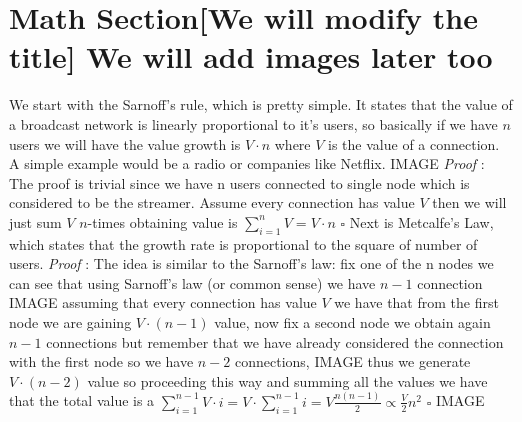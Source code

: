 \documentclass[12pt, a4page]{article}
\begin{document}
\section{Math Section[We will modify the title] We will add images later too}
We start with the Sarnoff's rule, which is pretty simple. It states that the value of a broadcast network is linearly proportional to it's users, so basically if we have $n$ users we will have the value growth is $V \cdot n$ where $V$ is the value of a connection. A simple example would be a radio or companies like Netflix.
\newline IMAGE \newline
\textit{Proof} : The proof is trivial since we have n users connected to single node which is considered to be the streamer. Assume every connection has value $V$ then we will just sum $V$ $n$-times obtaining value is $\sum_{i=1}^{n} V = V \cdot n$ \hfill $\square$
\newline
\newline
Next is Metcalfe's Law, which states that the growth rate is proportional to the square of number of users.\newline
\textit{Proof} : The idea is similar to the Sarnoff's law: fix one of the n nodes we can see that using Sarnoff's law (or common sense) we have $n-1$ connection
IMAGE \newline
assuming that every connection has value $V$ we have that from the first node we are gaining $V \cdot (n - 1)$ value, now fix a second node we obtain again $n-1$ connections but remember that we have already considered the connection with the first node so we have $n-2$ connections,\newline
IMAGE \newline
thus we generate $V \cdot (n - 2)$ value so proceeding this way and summing all the values we have that the total value is a $\sum_{i=1}^{n-1} V \cdot i = V \cdot \sum_{i=1}^{n-1} i = V \frac{n(n-1)}{2} \propto \frac{V}{2} n^2$  \hfill $\square$
\newline IMAGE \newline


\end{document}
